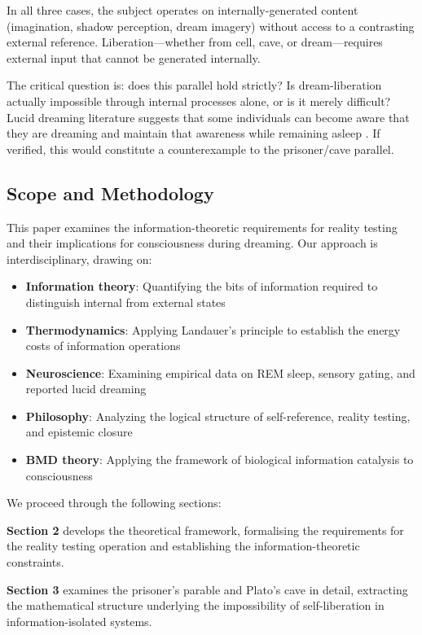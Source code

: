 \documentclass[11pt,a4paper]{article}
\begin{document}
In all three cases, the subject operates on internally-generated content (imagination, shadow perception, dream imagery) without access to a contrasting external reference. Liberation—whether from cell, cave, or dream—requires external input that cannot be generated internally.

The critical question is: does this parallel hold strictly? Is dream-liberation actually impossible through internal processes alone, or is it merely difficult? Lucid dreaming literature suggests that some individuals can become aware that they are dreaming and maintain that awareness while remaining asleep \cite{laberge1985lucid,voss2009lucid}. If verified, this would constitute a counterexample to the prisoner/cave parallel.

\subsection{Scope and Methodology}

This paper examines the information-theoretic requirements for reality testing and their implications for consciousness during dreaming. Our approach is interdisciplinary, drawing on:

\begin{itemize}
\item \textbf{Information theory}: Quantifying the bits of information required to distinguish internal from external states
\item \textbf{Thermodynamics}: Applying Landauer's principle to establish the energy costs of information operations
\item \textbf{Neuroscience}: Examining empirical data on REM sleep, sensory gating, and reported lucid dreaming
\item \textbf{Philosophy}: Analyzing the logical structure of self-reference, reality testing, and epistemic closure
\item \textbf{BMD theory}: Applying the framework of biological information catalysis to consciousness
\end{itemize}

We proceed through the following sections:

\textbf{Section 2} develops the theoretical framework, formalising the requirements for the reality testing operation and establishing the information-theoretic constraints.

\textbf{Section 3} examines the prisoner's parable and Plato's cave in detail, extracting the mathematical structure underlying the impossibility of self-liberation in information-isolated systems.
\end{document}
